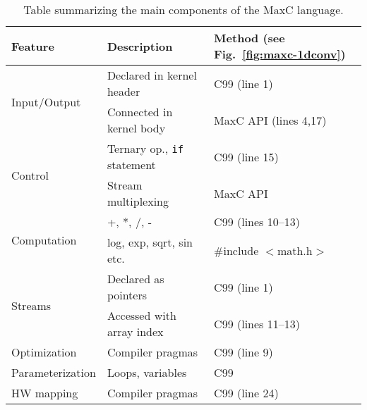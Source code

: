 \begin{table}[!h]
  \centering
\renewcommand{\arraystretch}{1.2}
\caption{Table summarizing the main components of the MaxC language.}
\label{table:maxc-features}
\begin{tabular}{l|l|l}
\hline
\bf{Feature}                   & \bf{Description}                   & \bf{Method (see Fig.~\ref{fig:maxc-1dconv})} \\
\hline\hline
  \multirow{2}{*}{Input/Output}         & Declared in kernel header          & C99 (line 1)                                 \\\cline{2-3}       & Connected in kernel body  & MaxC API (lines 4,17) \\
\hline
  \multirow{2}{*}{Control}     & Ternary op., \texttt{if} statement & C99 (line 15)                                \\\cline{2-3}      & Stream multiplexing       & MaxC API  \\
\hline
  \multirow{2}{*}{Computation} & +, *, /, -                         & C99 (lines 10--13)                           \\\cline{2-3} & log, exp, sqrt, sin etc.  & \#include $<$math.h$>$  \\
\hline
  \multirow{2}{*}{Streams}     & Declared as pointers               & C99 (line 1)                                 \\\cline{2-3}       & Accessed with array index & C99 (lines 11--13) \\
\hline
  Optimization                 & Compiler pragmas                   & C99 (line 9)                                 \\
\hline
  Parameterization             & Loops, variables                   & C99                                          \\
\hline
HW mapping                  & Compiler pragmas                   & C99 (line 24)                                \\

\end{tabular}
\end{table}

\lstset{style=MaxC}

